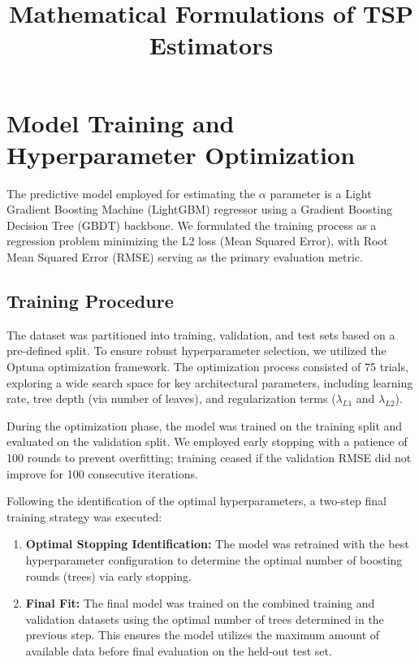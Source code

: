 \documentclass{article}
\title{Mathematical Formulations of TSP Estimators}
\author{}
\date{}
\begin{document}
\maketitle
\section{Model Training and Hyperparameter Optimization}

The predictive model employed for estimating the $\alpha$ parameter is a Light Gradient Boosting Machine (LightGBM) regressor using a Gradient Boosting Decision Tree (GBDT) backbone. We formulated the training process as a regression problem minimizing the L2 loss (Mean Squared Error), with Root Mean Squared Error (RMSE) serving as the primary evaluation metric.

\subsection{Training Procedure}
The dataset was partitioned into training, validation, and test sets based on a pre-defined split. To ensure robust hyperparameter selection, we utilized the Optuna optimization framework. The optimization process consisted of 75 trials, exploring a wide search space for key architectural parameters, including learning rate, tree depth (via number of leaves), and regularization terms ($\lambda_{L1}$ and $\lambda_{L2}$).

During the optimization phase, the model was trained on the training split and evaluated on the validation split. We employed early stopping with a patience of 100 rounds to prevent overfitting; training ceased if the validation RMSE did not improve for 100 consecutive iterations.

Following the identification of the optimal hyperparameters, a two-step final training strategy was executed:
\begin{enumerate}
    \item \textbf{Optimal Stopping Identification:} The model was retrained with the best hyperparameter configuration to determine the optimal number of boosting rounds (trees) via early stopping.
    \item \textbf{Final Fit:} The final model was trained on the combined training and validation datasets using the optimal number of trees determined in the previous step. This ensures the model utilizes the maximum amount of available data before final evaluation on the held-out test set.
\end{enumerate}
\end{document}
